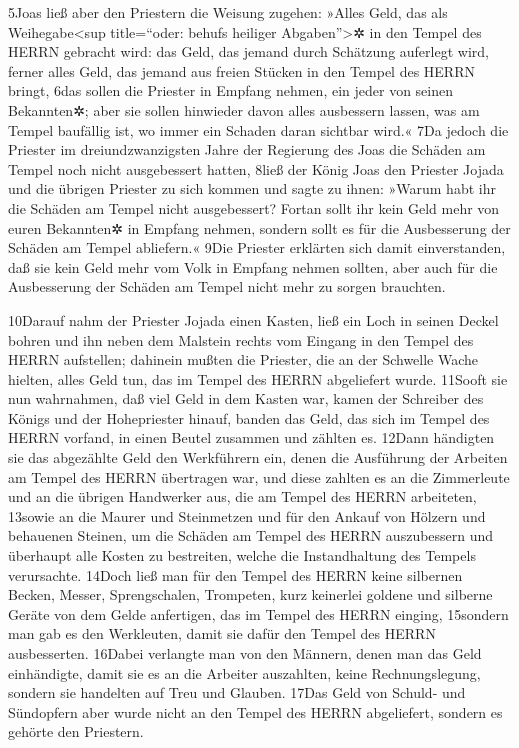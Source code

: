 5Joas ließ aber den Priestern die Weisung zugehen: »Alles Geld, das als
Weihegabe\textless sup title=``oder: behufs heiliger
Abgaben''\textgreater✲ in den Tempel des HERRN gebracht wird: das Geld,
das jemand durch Schätzung auferlegt wird, ferner alles Geld, das jemand
aus freien Stücken in den Tempel des HERRN bringt, 6das sollen die
Priester in Empfang nehmen, ein jeder von seinen Bekannten✲; aber sie
sollen hinwieder davon alles ausbessern lassen, was am Tempel baufällig
ist, wo immer ein Schaden daran sichtbar wird.« 7Da jedoch die Priester
im dreiundzwanzigsten Jahre der Regierung des Joas die Schäden am Tempel
noch nicht ausgebessert hatten, 8ließ der König Joas den Priester Jojada
und die übrigen Priester zu sich kommen und sagte zu ihnen: »Warum habt
ihr die Schäden am Tempel nicht ausgebessert? Fortan sollt ihr kein Geld
mehr von euren Bekannten✲ in Empfang nehmen, sondern sollt es für die
Ausbesserung der Schäden am Tempel abliefern.« 9Die Priester erklärten
sich damit einverstanden, daß sie kein Geld mehr vom Volk in Empfang
nehmen sollten, aber auch für die Ausbesserung der Schäden am Tempel
nicht mehr zu sorgen brauchten.

10Darauf nahm der Priester Jojada einen Kasten, ließ ein Loch in seinen
Deckel bohren und ihn neben dem Malstein rechts vom Eingang in den
Tempel des HERRN aufstellen; dahinein mußten die Priester, die an der
Schwelle Wache hielten, alles Geld tun, das im Tempel des HERRN
abgeliefert wurde. 11Sooft sie nun wahrnahmen, daß viel Geld in dem
Kasten war, kamen der Schreiber des Königs und der Hohepriester hinauf,
banden das Geld, das sich im Tempel des HERRN vorfand, in einen Beutel
zusammen und zählten es. 12Dann händigten sie das abgezählte Geld den
Werkführern ein, denen die Ausführung der Arbeiten am Tempel des HERRN
übertragen war, und diese zahlten es an die Zimmerleute und an die
übrigen Handwerker aus, die am Tempel des HERRN arbeiteten, 13sowie an
die Maurer und Steinmetzen und für den Ankauf von Hölzern und behauenen
Steinen, um die Schäden am Tempel des HERRN auszubessern und überhaupt
alle Kosten zu bestreiten, welche die Instandhaltung des Tempels
verursachte. 14Doch ließ man für den Tempel des HERRN keine silbernen
Becken, Messer, Sprengschalen, Trompeten, kurz keinerlei goldene und
silberne Geräte von dem Gelde anfertigen, das im Tempel des HERRN
einging, 15sondern man gab es den Werkleuten, damit sie dafür den Tempel
des HERRN ausbesserten. 16Dabei verlangte man von den Männern, denen man
das Geld einhändigte, damit sie es an die Arbeiter auszahlten, keine
Rechnungslegung, sondern sie handelten auf Treu und Glauben. 17Das Geld
von Schuld- und Sündopfern aber wurde nicht an den Tempel des HERRN
abgeliefert, sondern es gehörte den Priestern.

